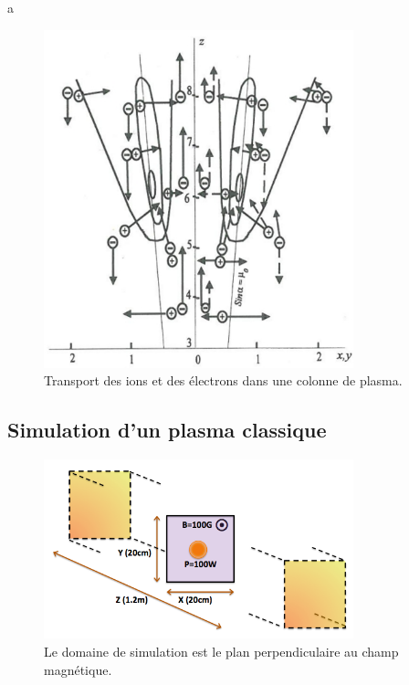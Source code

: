 \begin{refsection}
a

\begin{figure}[htbp]
\centering
\includegraphics[width=0.8\textwidth]{figures/4-magnetizedColumn.jpg}
{\caption{Transport des ions et des électrons dans une colonne de
plasma\parencite{Rozhansky}.}
\label{4-magnetizedColumn}}
\end{figure}

\subsection{Simulation d'un plasma classique}


\begin{figure}[htbp]
\centering
\includegraphics[width=0.8\textwidth]{figures/4-cybeleSimDomain.png}
{\caption{Le domaine de simulation est le plan perpendiculaire au champ
magnétique.}
\label{4-cybeleSimDomain}}
\end{figure}


\end{refsection}
